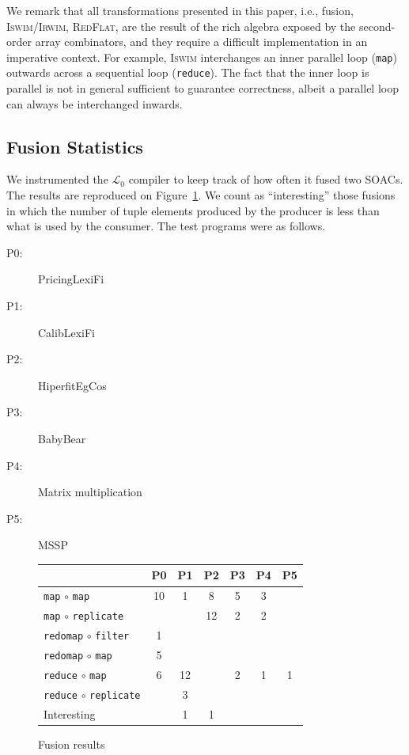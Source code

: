 \documentclass{sigplanconf}  %
\newcommand{\LO}{$\mathcal{L}_0$}
\begin{document}
We remark that all transformations presented in this paper, i.e., fusion, 
\textsc{Iswim}/\textsc{Irwim}, \textsc{RedFlat}, are the result of the
rich algebra exposed by the second-order array combinators, and they require
a difficult implementation in an imperative context.   For example, 
\textsc{Iswim} interchanges an inner parallel loop ({\tt map}) outwards across
a sequential loop ({\tt reduce}). The fact that the inner loop is parallel
is not in general sufficient to guarantee correctness, albeit a parallel 
loop can always be interchanged inwards.  

\subsection{Fusion Statistics}
\label{sec:results}

We instrumented the \LO{} compiler to keep track of how often it fused
two SOACs.  The results are reproduced on Figure~\ref{fig:fusion}.  We
count as ``interesting'' those fusions in which the number of tuple
elements produced by the producer is less than what is used by the
consumer.  The test programs were as follows.

\begin{description}
\item[P0:] PricingLexiFi
\item[P1:] CalibLexiFi
\item[P2:] HiperfitEgCos
\item[P3:] BabyBear
\item[P4:] Matrix multiplication
\item[P5:] MSSP
\end{description}

\begin{figure}
\begin{center}
\begin{tabular}{l|c|c|c|c|c|c}
& P0 & P1 & P2 & P3 & P4 & P5 \\\hline\hline
{\tt map} $\circ$ {\tt map}          & 10 & 1  & 8  & 5 & 3  &   \\\hline
{\tt map} $\circ$ {\tt replicate}    &    &    & 12 & 2 & 2  &   \\\hline
{\tt redomap} $\circ$ {\tt filter}   & 1  &    &    &   &    &   \\\hline
{\tt redomap} $\circ$ {\tt map}      & 5  &    &    &   &    &   \\\hline
{\tt reduce} $\circ$ {\tt map}       & 6  & 12 &    & 2 & 1  & 1 \\\hline
{\tt reduce} $\circ$ {\tt replicate} &    & 3  &    &   &    &   \\\hline\hline
Interesting            &    & 1  & 1  &   &    &   \\
\end{tabular}
\end{center}
\caption{Fusion results}
\label{fig:fusion}
\end{figure}
\end{document}
